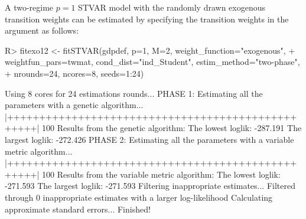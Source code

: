 \documentclass[nojss]{jss}
\begin{document}
A two-regime $p=1$ STVAR model with the randomly drawn exogenous transition weights can be estimated by specifying the transition weights in the argument  as follows:
\begin{CodeChunk}
\begin{CodeInput}
R> fitexo12 <- fitSTVAR(gdpdef, p=1, M=2, weight_function="exogenous",
+    weightfun_pars=twmat, cond_dist="ind_Student", estim_method="two-phase",
+    nrounds=24, ncores=8, seeds=1:24)
\end{CodeInput}
\begin{CodeOutput}
Using 8 cores for 24 estimations rounds...
PHASE 1: Estimating all the parameters with a genetic algorithm...
  |++++++++++++++++++++++++++++++++++++++++++++++++++| 100%
Results from the genetic algorithm:
The lowest loglik:  -287.191
The largest loglik: -272.426
PHASE 2: Estimating all the parameters with a variable metric algorithm...
  |++++++++++++++++++++++++++++++++++++++++++++++++++| 100%
Results from the variable metric algorithm:
The lowest loglik:  -271.593
The largest loglik: -271.593
Filtering inappropriate estimates...
Filtered through 0 inappropriate  estimates with a larger log-likelihood
Calculating approximate standard errors...
Finished!
\end{CodeOutput}
\end{CodeChunk}
\end{document}
